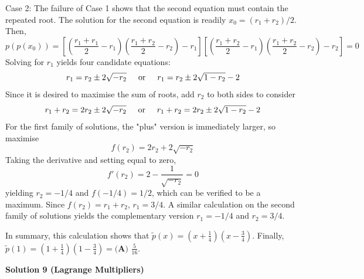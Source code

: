 \begin{enumerate}
 Case 2: The failure of Case 1 shows that the second equation must contain the repeated root. The solution for the second equation is readily $x_0 = (r_1+r_2)/2$. Then,
 \[p(p(x_0)) = \left[\left(\frac{r_1+r_1}{2}-r_1\right)\left(\frac{r_1+r_2}{2}-r_2\right)-r_1\right]\left[\left(\frac{r_1+r_2}{2}-r_1\right)\left(\frac{r_1+r_2}{2}-r_2\right)-r_2\right] = 0\]Solving for $r_1$ yields four candidate equations:
 \[r_1 = r_2\pm 2\sqrt{-r_2} \hspace{.5cm}\text{or}\hspace{.5cm} r_1 = r_2\pm 2\sqrt{1-r_2} - 2\]Since it is desired to maximise the sum of roots, add $r_2$ to both sides to consider
 \[r_1+r_2 = 2r_2\pm 2\sqrt{-r_2} \hspace{.5cm}\text{or}\hspace{.5cm} r_1+r_2 = 2r_2\pm 2\sqrt{1-r_2} - 2\]For the first family of solutions, the "plus" version is immediately larger, so maximise
 \[f(r_2) = 2r_2 + 2\sqrt{-r_2}\]Taking the derivative and setting equal to zero,
 \[f'(r_2) = 2 - \frac{1}{\sqrt{-r_2}} = 0\]yielding $r_2=-1/4$ and $f(-1/4)=1/2$, which can be verified to be a maximum. Since $f(r_2)=r_1+r_2$, $r_1=3/4$. A similar calculation on the second family of solutions yields the complementary version $r_1=-1/4$ and $r_2=3/4$.

 In summary, this calculation shows that $\tilde{p}(x)=\left(x+\frac{1}{4}\right)\left(x-\frac{3}{4}\right)$. Finally, $\tilde{p}(1)=\left(1+\frac{1}{4}\right)\left(1-\frac{3}{4}\right)=\boxed{\textbf{(A) } \frac{5}{16}}$.

 



\textbf{Solution 9 (Lagrange Multipliers)}


\end{enumerate}
